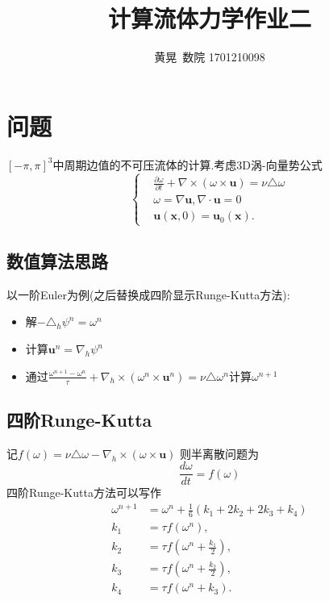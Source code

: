 \documentclass[UTF8]{ctexart}
\author{黄晃\ 数院 1701210098 }
\title{计算流体力学作业二}
\begin{document}
  \maketitle

\section{问题}
$[-\pi,\pi]^3$中周期边值的不可压流体的计算.考虑3D涡-向量势公式
\begin{equation*}
  \left\{
  \begin{split}
       & \frac{\partial\omega}{\partial t}+\nabla \times(\omega \times \mathbf{u}) = \nu \triangle \omega \\
       & \omega = \nabla \mathbf{u},\nabla \cdot \mathbf{u}=0 \\
       & \mathbf{u}(\mathbf{x},0) = \mathbf{u}_0(\mathbf{x}).
  \end{split}
  \right.
\end{equation*}
\subsection{数值算法思路}
以一阶Euler为例(之后替换成四阶显示Runge-Kutta方法):
\begin{itemize}
  \item 解$-\triangle_h \psi^n = \omega^n$
  \item 计算$\mathbf{u}^n=\nabla_h \psi^n$
  \item 通过$\frac{\omega^{n+1}-\omega^n}{\tau}+\nabla_h\times(\omega^n \times \mathbf{u}^n) = \nu \triangle \omega^n$计算$\omega^{n+1}$
\end{itemize}
\subsection{四阶Runge-Kutta}
记$f(\omega)=\nu \triangle \omega - \nabla_h\times(\omega \times \mathbf{u})$
则半离散问题为
$$
\frac{d\omega}{dt}=f(\omega)
$$
四阶Runge-Kutta方法可以写作
\begin{equation*}
\begin{aligned}
\omega^{n+1} &= \omega^n+\frac{1}{6}(k_1+2k_2+2k_3+k_4) \\
k_1 &= \tau f(\omega^n),\\
k_2 &=\tau f(\omega^n+\frac{k_1}{2}),\\
k_3&= \tau f(\omega^n+\frac{k_2}{2}),\\
k_4&=\tau f(\omega^n+k_3).
\end{aligned}
\end{equation*}
\end{document}
